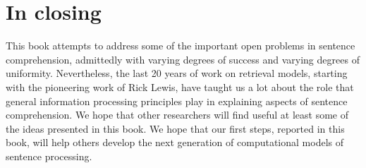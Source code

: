 \documentclass{cambridge7A}\usepackage[]{graphicx}\usepackage[]{color}
\begin{document}
\section{In closing}

This book attempts to address some of the important open problems in sentence comprehension, admittedly with varying  degrees of success and varying degrees of uniformity. Nevertheless, the last 20 years of work on retrieval models, starting with the pioneering work of Rick Lewis, have taught us a lot about the role that general information processing principles play in explaining aspects of sentence comprehension. We hope that other researchers will find useful at least some of the ideas presented in this book. We hope that our first steps, reported in this book, will help others develop the next generation of computational models of sentence processing.


\backmatter
\appendix
%  
%  
%  
  \endappendix

  \renewcommand{\refname}{Bibliography}%
  \bookreferences %
\label{refs}


\cleardoublepage

\printindex
\end{document}
